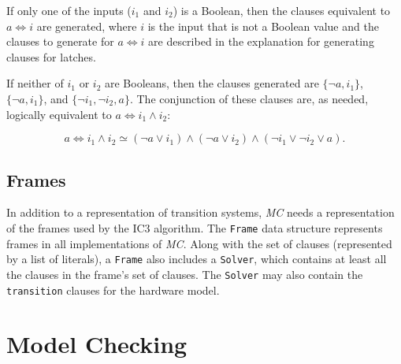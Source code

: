 \documentclass[12pt,a4paper,twoside,openright]{report}
\begin{document}
{If only one of the inputs ($i_1$ and $i_2$) is a Boolean, then the clauses equivalent to $a \Leftrightarrow i$
are generated, where $i$ is the input that is not a Boolean value and the clauses to generate for $a \Leftrightarrow i$ 
are described in the explanation for generating clauses for latches.

If neither of $i_1$ or $i_2$ are Booleans, then the clauses generated are
$\{\neg a, i_1\}$, $\{\neg a, i_1\}$, and
$\{\neg i_1,\neg i_2, a\}$. The conjunction of these clauses are, as needed,
logically equivalent to $a \Leftrightarrow i_1 \wedge i_2$:

$$a \Leftrightarrow i_1 \wedge i_2 \simeq
(\neg a \vee i_1) \wedge (\neg a \vee i_2) \wedge (\neg i_1 \vee \neg i_2 \vee a).$$

\subsection{Frames}
In addition to a representation of transition systems, \emph{MC} needs a representation
of the frames used by the IC3 algorithm.
The \verb,Frame, data structure represents frames in all implementations of \emph{MC}.
Along with the set of clauses (represented by a list of literals), a \verb,Frame, also
includes a \verb,Solver,, which contains at least all the clauses in the frame's set
of clauses.
The \verb,Solver, may also contain the \verb,transition, clauses for the hardware model.

\section{Model Checking}
\label{impl:modelchecker}

}
\end{document}

